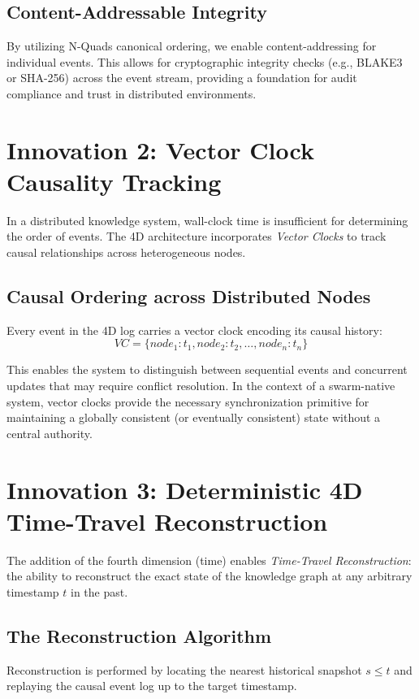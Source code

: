 \subsection{Content-Addressable Integrity}
By utilizing N-Quads canonical ordering, we enable content-addressing for individual events. This allows for cryptographic integrity checks (e.g., BLAKE3 or SHA-256) across the event stream, providing a foundation for audit compliance and trust in distributed environments.

\section{Innovation 2: Vector Clock Causality Tracking}

In a distributed knowledge system, wall-clock time is insufficient for determining the order of events. The 4D architecture incorporates \textit{Vector Clocks} to track causal relationships across heterogeneous nodes.

\subsection{Causal Ordering across Distributed Nodes}
Every event in the 4D log carries a vector clock encoding its causal history:
\begin{equation}
VC = \{node_1: t_1, node_2: t_2, \ldots, node_n: t_n\}
\end{equation}

This enables the system to distinguish between sequential events and concurrent updates that may require conflict resolution. In the context of a swarm-native system, vector clocks provide the necessary synchronization primitive for maintaining a globally consistent (or eventually consistent) state without a central authority.

\section{Innovation 3: Deterministic 4D Time-Travel Reconstruction}

The addition of the fourth dimension (time) enables \textit{Time-Travel Reconstruction}: the ability to reconstruct the exact state of the knowledge graph at any arbitrary timestamp $t$ in the past.

\subsection{The Reconstruction Algorithm}
Reconstruction is performed by locating the nearest historical snapshot $s \le t$ and replaying the causal event log up to the target timestamp.

